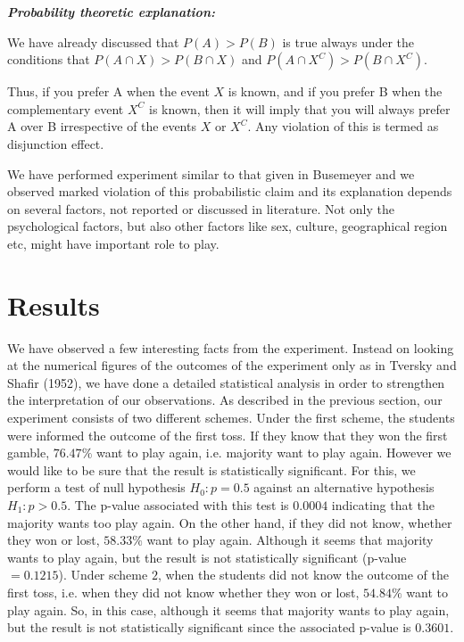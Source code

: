 \documentclass[review]{elsarticle}
\begin{document}
{\it {\bf Probability theoretic explanation:}}

We have already discussed that $P(A) > P(B)$ is true always under the conditions that $P(A\cap X) > P(B \cap X)$ and $P(A\cap X^C) > P(B \cap X^C)$. 

Thus, if you prefer A when the event $X$ is known, and if you prefer B when the complementary event $X^C$ is known, then it will imply that you will always prefer A over B irrespective of the events $X$ or $X^C$. Any violation of this is termed as disjunction effect.

We have performed experiment similar to that given in Busemeyer and we observed marked violation of this probabilistic claim and its explanation depends on several factors,  not reported or discussed in literature. Not only the psychological factors, but also other factors like sex, culture, geographical region etc, might have important role to play.

\section{Results}
 We have observed a few interesting facts from the experiment. Instead on looking at the numerical figures of the outcomes of the experiment only as in Tversky and Shafir (1952), we have done a detailed statistical analysis in order to strengthen the interpretation of our observations. As described in the previous section, our experiment consists of two different schemes. Under the first scheme, the students were informed the outcome of the first toss. If they know that they won the first gamble, $76.47\%$ want to play again, i.e. majority want to play again. However we would like to be sure that the result is statistically significant. For this, we perform a test of null hypothesis $H_0:p=0.5$ against an alternative hypothesis $H_1:p>0.5$. The p-value associated with this test is $0.0004$ indicating that the majority wants too play again. On the other hand, if they did not know, whether they won or lost, $58.33\%$ want to play again. Although it seems that majority wants to play again, but the result is not statistically significant (p-value$=0.1215$). Under scheme $2$, when the students did not know the outcome of the first toss, i.e. when they did not know whether they won or lost, $54.84\%$ want to play again. So, in this case, although it seems that majority wants to play again, but the result is not statistically significant since the associated p-value is $0.3601$.
\end{document}
